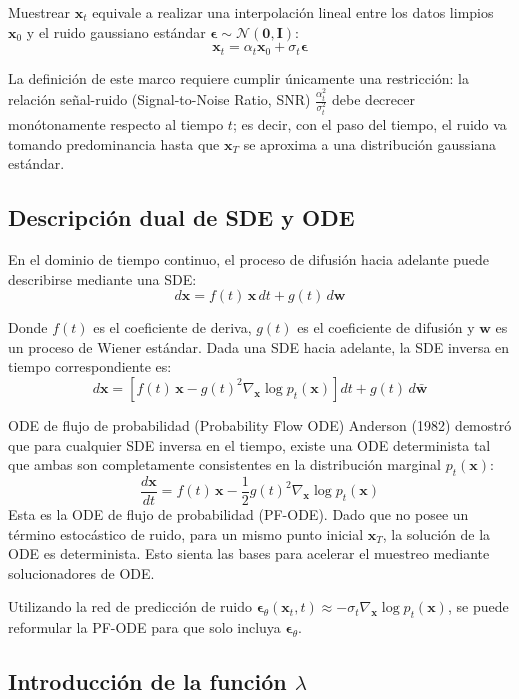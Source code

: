 \documentclass[a4paper]{article}
\begin{document}
Muestrear $\mathbf{x}_t$ equivale a realizar una interpolación lineal entre los datos limpios $\mathbf{x}_0$ y el ruido gaussiano estándar $\boldsymbol{\epsilon} \sim \mathcal{N}(\mathbf{0}, \mathbf{I})$:
$$\mathbf{x}_t = \alpha_t \mathbf{x}_0 + \sigma_t \boldsymbol{\epsilon}$$

La definición de este marco requiere cumplir únicamente una restricción: la relación señal-ruido (Signal-to-Noise Ratio, SNR) $\frac{\alpha_t^2}{\sigma_t^2}$ debe decrecer monótonamente respecto al tiempo $t$; es decir, con el paso del tiempo, el ruido va tomando predominancia hasta que $\mathbf{x}_T$ se aproxima a una distribución gaussiana estándar.

\subsection{Descripción dual de SDE y ODE}

En el dominio de tiempo continuo, el proceso de difusión hacia adelante puede describirse mediante una SDE:
$$d\mathbf{x} = f(t)\, \mathbf{x}\, dt + g(t)\, d\mathbf{w}$$

Donde $f(t)$ es el coeficiente de deriva, $g(t)$ es el coeficiente de difusión y $\mathbf{w}$ es un proceso de Wiener estándar. Dada una SDE hacia adelante, la SDE inversa en tiempo correspondiente es:
$$d\mathbf{x} = \left[f(t)\, \mathbf{x} - g(t)^2 \nabla_{\mathbf{x}} \log p_t(\mathbf{x})\right] dt + g(t)\, d\bar{\mathbf{w}}$$

\begin{importantbox}{ODE de flujo de probabilidad (Probability Flow ODE)}
Anderson (1982) demostró que para cualquier SDE inversa en el tiempo, existe una ODE determinista tal que ambas son completamente consistentes en la distribución marginal $p_t(\mathbf{x})$:
$$\frac{d\mathbf{x}}{dt} = f(t)\, \mathbf{x} - \frac{1}{2} g(t)^2 \nabla_{\mathbf{x}} \log p_t(\mathbf{x})$$
Esta es la ODE de flujo de probabilidad (PF-ODE). Dado que no posee un término estocástico de ruido, para un mismo punto inicial $\mathbf{x}_T$, la solución de la ODE es determinista. Esto sienta las bases para acelerar el muestreo mediante solucionadores de ODE.
\end{importantbox}

Utilizando la red de predicción de ruido $\boldsymbol{\epsilon}_\theta(\mathbf{x}_t, t) \approx -\sigma_t \nabla_{\mathbf{x}} \log p_t(\mathbf{x})$, se puede reformular la PF-ODE para que solo incluya $\boldsymbol{\epsilon}_\theta$.

\subsection{Introducción de la función $\lambda$}
\end{document}
